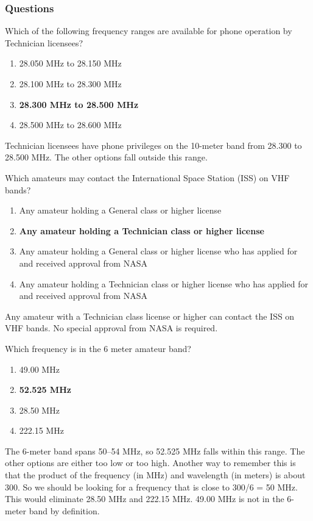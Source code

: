 \subsubsection{Questions}
\begin{tcolorbox}[colback=gray!10!white,colframe=black!75!black,title={T1B01}]
    Which of the following frequency ranges are available for phone operation by Technician licensees?
    \begin{enumerate}[label=\Alph*),noitemsep]
        \item 28.050 MHz to 28.150 MHz
        \item 28.100 MHz to 28.300 MHz
        \item \textbf{28.300 MHz to 28.500 MHz}
        \item 28.500 MHz to 28.600 MHz
    \end{enumerate}
\end{tcolorbox}
Technician licensees have phone privileges on the 10-meter band from 28.300 to 28.500 MHz. The other options fall outside this range.

\begin{tcolorbox}[colback=gray!10!white,colframe=black!75!black,title={T1B02}]
    Which amateurs may contact the International Space Station (ISS) on VHF bands?
    \begin{enumerate}[label=\Alph*),noitemsep]
        \item Any amateur holding a General class or higher license
        \item \textbf{Any amateur holding a Technician class or higher license}
        \item Any amateur holding a General class or higher license who has applied for and received approval from NASA
        \item Any amateur holding a Technician class or higher license who has applied for and received approval from NASA
    \end{enumerate}
\end{tcolorbox}
Any amateur with a Technician class license or higher can contact the ISS on VHF bands. No special approval from NASA is required.

\begin{tcolorbox}[colback=gray!10!white,colframe=black!75!black,title={T1B03}]
    Which frequency is in the 6 meter amateur band?
    \begin{enumerate}[label=\Alph*),noitemsep]
        \item 49.00 MHz
        \item \textbf{52.525 MHz}
        \item 28.50 MHz
        \item 222.15 MHz
    \end{enumerate}
\end{tcolorbox}
The 6-meter band spans 50–54 MHz, so 52.525 MHz falls within this range. The other options are either too low or too high. Another way to remember this is that the product of the frequency (in MHz) and wavelength (in meters) is about 300. So we should be looking for a frequency that is close to 300/6 = 50 MHz. This would eliminate 28.50 MHz and 222.15 MHz. 49.00 MHz is not in the 6-meter band by definition.

